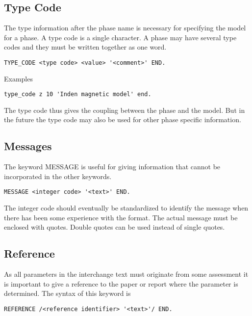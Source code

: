 \documentclass[12pt]{article}
\begin{document}
\subsection{Type Code}

The type information after the phase name is necessary for
specifying the model for a phase. A type code is a single character. A
phase may have several type codes and they must be written together as
one word.

\begin{verbatim}
TYPE_CODE <type code> <value> '<comment>' END.
\end{verbatim}

Examples

\begin{verbatim}
type_code z 10 'Inden magnetic model' end.
\end{verbatim}

The type code thus gives the coupling between the phase and the model.
But in the future the type code may also be used for other phase
specific information.

\subsection{Messages}

The keyword MESSAGE is useful for giving information that cannot be
incorporated in the other keywords. 

\begin{verbatim}
MESSAGE <integer code> '<text>' END.
\end{verbatim}

The integer code should eventually be standardized to identify the
message when there has been some experience with the format. The
actual message must be enclosed with quotes. Double quotes can be used
instead of single quotes.

\subsection{Reference}

As all parameters in the interchange text must originate from some
assessment it is important to give a reference to the paper or report
where the parameter is determined. The syntax of this keyword is

\begin{verbatim}
REFERENCE /<reference identifier> '<text>'/ END.
\end{verbatim}
\end{document}
